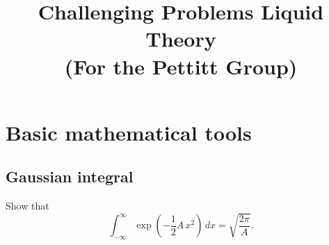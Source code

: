 \documentclass[12pt]{book}
\begin{document}
\newcommand{\problem}[1]{\section{#1}}
\newcommand{\hint}[1]{[\,\emph{Hint.} #1]}

\newcommand{\vct}[1]{\boldsymbol{\mathbf{#1}}}
\newcommand{\vr}{\vct{r}}
\newcommand{\vrN}{\vr^N}
\newcommand{\vrn}{\vr^n}
\newcommand{\dvr}{\frac{ d \vr  }{(2\pi)^3}}
\newcommand{\vx}{\vct{x}}
\newcommand{\vxN}{\vx^N}
\newcommand{\vxn}{\vx^n}
\newcommand{\dvx}{\frac{ d \vx  }{(2\pi)^3}}
\newcommand{\vk}{\vct{k}}
\newcommand{\dvk}{\frac{ d \vk  }{(2\pi)^3}}
\newcommand{\FT}[1]{\tilde{#1}}
\newcommand{\FTc}{\FT{c}}
\newcommand{\FTh}{\FT{h}}

\newcommand{\supex}[1]{ { { #1 }^{ \mathrm{ex} } } }
\newcommand{\Pex}{\supex{P}}
\newcommand{\Fex}{\supex{F}}
\newcommand{\muex}{\supex{\mu}}
\newcommand{\kex}{\supex{\kappa}}
\newcommand{\Chn}{\mathscr{C}}
\newcommand{\secref}[1]{Sec. \ref{#1}}

\newcommand{\llbra}{[\![}
\newcommand{\llket}{]\!]}

\newcommand{\plam}{\partial_\lambda}
\newcommand{\pbet}{\partial_\beta}



\title{Challenging Problems Liquid Theory \\
  (For the Pettitt Group)}
\date{}
\maketitle

\tableofcontents





\chapter{Basic mathematical tools}



\problem{Gaussian integral}

Show that
\begin{equation}
  \int_{-\infty}^{\infty}
    \exp\left( -\frac{1}{2} A \, x^2 \right) \, dx
  =
  \sqrt{ \frac{ 2 \pi }{ A } }.
  \label{eq:GaussianIntegral}
\end{equation}
\end{document}
